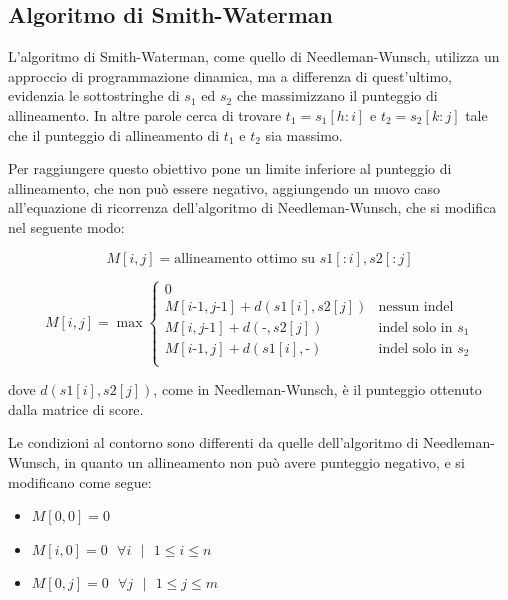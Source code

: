 \subsection{Algoritmo di Smith-Waterman}
L'algoritmo di Smith-Waterman, come quello di Needleman-Wunsch, utilizza un approccio di programmazione dinamica, ma a differenza di quest'ultimo, evidenzia le sottostringhe di $s_1$ ed $s_2$ che massimizzano il punteggio di allineamento. In altre parole cerca di trovare $t_1=s_1[h:i]$ e $t_2=s_2[k:j]$ tale che il punteggio di allineamento di $t_1$ e $t_2$ sia massimo.

Per raggiungere questo obiettivo pone un limite inferiore al punteggio di allineamento, che non può essere negativo, aggiungendo un nuovo caso all'equazione di ricorrenza dell'algoritmo di Needleman-Wunsch, che si modifica nel seguente modo:

\begin{equation*}
    M[i, j] = \textrm{allineamento  ottimo  su }  s1[:i],  s2[:j]
\end{equation*}

\begin{equation}
    M[i, j] = \max  {
                    \begin{cases} 
                        0\\
                        M[i \textrm{-} 1,j \textrm{-} 1] +d(s1[i],s2[j]) & \textrm{nessun indel}\\
                        M[i,j \textrm{-} 1] +d(\textrm{-},s2[j]) & \textrm{indel solo in } s_1\\
                        M[i \textrm{-} 1,j] +d(s1[i],\textrm{-}) & \textrm{indel solo in } s_2\\
                    \end{cases}
                    }
\end{equation}

dove $d(s1[i],s2[j])$, come in Needleman-Wunsch, è il punteggio ottenuto dalla matrice di score.

Le condizioni al contorno sono differenti da quelle dell'algoritmo di Needleman-Wunsch, in quanto un allineamento non può avere punteggio negativo, e si modificano come segue:

\begin{itemize}
    \item $M[0,0]=0$
    \item $M[i,0]=0 \textrm{ } \forall i \textrm{ } | \textrm{ } 1\leqslant i \leqslant n$
    \item $M[0,j]=0 \textrm{ } \forall j \textrm{ }| \textrm{ } 1\leqslant j \leqslant m$
\end{itemize}

